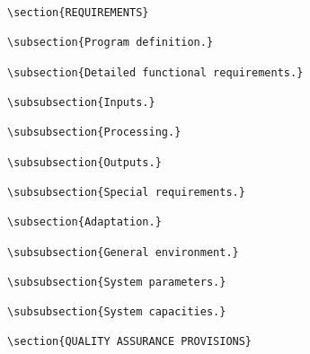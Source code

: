 \begin{itemize}
\begin{small}
\begin{verbatim}
\section{REQUIREMENTS}

\subsection{Program definition.}

\subsection{Detailed functional requirements.}

\subsubsection{Inputs.}

\subsubsection{Processing.}

\subsubsection{Outputs.}

\subsubsection{Special requirements.}

\subsection{Adaptation.}

\subsubsection{General environment.}

\subsubsection{System parameters.}

\subsubsection{System capacities.}

\section{QUALITY ASSURANCE PROVISIONS}


\end{verbatim}
\end{small}
\end{itemize}
